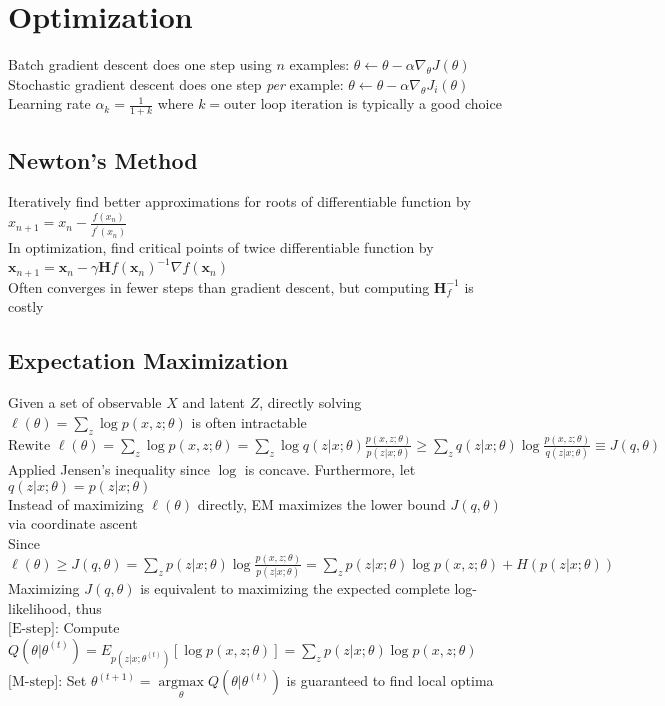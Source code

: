 \documentclass{article}
\DeclareMathOperator*{\argmax}{argmax}
\begin{document}
\newpage
\section{Optimization}
Batch gradient descent does one step using $n$ examples: $ \theta \leftarrow \theta - \alpha \nabla_\theta J(\theta)$ \\
Stochastic gradient descent does one step \textit{per} example: $\theta \leftarrow \theta - \alpha \nabla_\theta J_i(\theta)$ \\
Learning rate $\alpha_k = \frac{1}{1+k}$ where $k = \mbox{outer loop iteration}$ is typically a good choice

\subsection{Newton's Method}
Iteratively find better approximations for roots of differentiable function by $x_{n+1} = x_n - \frac{f(x_n)}{f^\prime(x_n)}$ \\
In optimization, find critical points of twice differentiable function by $\boldsymbol{x}_{n+1} = \boldsymbol{x}_n - \gamma \boldsymbol{H}f(\boldsymbol{x}_n)^{-1} \nabla f(\boldsymbol{x}_n) $ \\
Often converges in fewer steps than gradient descent, but computing $\boldsymbol{H}_f^{-1}$ is costly 

\subsection{Expectation Maximization}
Given a set of observable $X$ and latent $Z$, directly solving $\ell(\theta) = \sum_z \log p(x, z ; \theta)$ is often intractable \\
${\mbox{Rewite }\ell(\theta) = \sum_z \log p(x, z ; \theta) = \sum_z \log q(z|x; \theta) \frac{p(x, z ; \theta)}{p(z | x;\theta)} \geq \sum_z q(z | x; \theta) \log  \frac{p(x, z ; \theta)}{q(z | x;\theta)} \equiv J(q, \theta)}$ \\
Applied Jensen's inequality since $\log$ is concave. Furthermore, let $q(z| x; \theta) = p(z|x;\theta)$ \\
Instead of maximizing $\ell(\theta)$ directly, EM maximizes the lower bound $J(q, \theta)$ via coordinate ascent \\
Since $\ell(\theta) \geq J(q, \theta) = \sum_z p(z|x; \theta) \log \frac{p(x, z ; \theta)}{p(z | x;\theta)} = \sum_z p(z|x; \theta) \log p(x, z ; \theta) + H(p(z|x;\theta))$ \\
Maximizing $J(q, \theta)$ is equivalent to maximizing the expected complete log-likelihood, thus \\
$\mbox{[E-step]}$: Compute $Q(\theta | \theta^{(t)}) = E_{p(z|x;\theta^{(t)})}[\log p(x, z ;\theta)] =  \sum_z p(z|x; \theta) \log p(x, z ; \theta) $ \\
$\mbox{[M-step]}$: Set $\theta^{(t+1)} = \argmax\limits_\theta Q(\theta | \theta^{(t)})$ is guaranteed to find local optima 
\end{document}
